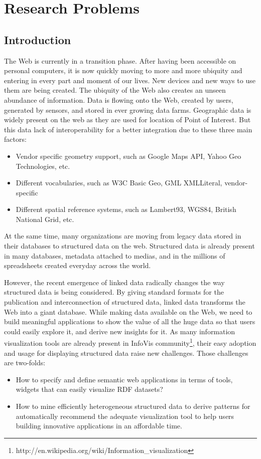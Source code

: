 \documentclass[a4paper,11pt]{report}
\begin{document}


\chapter{Research Problems}

\section{Introduction}
The Web is currently in a transition phase. After having been accessible on personal computers, it is now 
quickly moving to more and more ubiquity and entering in every part and moment of our lives. New 
devices and new ways to use them are being created. The ubiquity of the Web also creates an unseen 
abundance of information. Data is flowing onto the Web, created by users, generated by sensors, and 
stored in ever growing data farms. Geographic data is widely present on the web as they are used for location 
of Point of Interest. But this data lack of interoperability for a better integration due to these three main factors:
\begin{itemize}
\item Vendor specific geometry support, such as Google Maps API, Yahoo Geo Technologies, etc.
\item Different vocabularies, such as W3C Basic Geo, GML XMLLiteral, vendor-specific
\item Different spatial reference systems, such as Lambert93, WGS84, British National Grid, etc.
\end{itemize}
At the same time, many organizations are moving from legacy data stored in their databases
to structured data on the web. Structured data is already present in many databases, metadata attached to medias, and in the millions of spreadsheets created everyday across the world. 

However, the recent emergence of linked data radically changes the way structured data is being considered. By giving standard formats for the publication and interconnection of structured data, linked data transforms the Web into a giant database. While making data available on the Web, we need to build meaningful applications to show the value of all the huge data so that users could easily explore it, and derive new insights for it. As many information visualization tools are already present in InfoVis community\footnote{http://en.wikipedia.org/wiki/Information\_visualization}, their easy adoption and usage for displaying structured data raise new challenges. Those challenges are two-folds:
\begin{itemize}
\item How to specify and define semantic web applications in terms of tools, widgets that can easily visualize RDF datasets?
\item How to mine efficiently heterogeneous structured data to derive patterns for automatically recommend the adequate visualization tool to help users building innovative applications in an affordable time.
\end{itemize}
\end{document}
